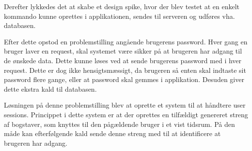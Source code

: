 Derefter lykkedes det at skabe et design spike, hvor der blev testet at en enkelt kommando kunne oprettes i applikationen, sendes til serveren og udføres vha. databasen. 

Efter dette opstod en problemstilling angående brugerens password. Hver gang en bruger laver en request, skal systemet være sikker på at brugeren har adgang til de ønskede data. Dette kunne løses ved at sende brugerens password med i hver request. Dette er dog ikke hensigtsmæssigt, da brugeren så enten skal indtaste sit password flere gange, eller at password skal gemmes i applikation. Desuden giver dette ekstra kald til databasen. 

Løsningen på denne problemstilling blev at oprette et system til at håndtere user sessions. Princippet i dette system er at der oprettes en tilfældigt genereret streng af bogstaver, som knyttes til den pågældende bruger i et vist tidsrum. På den måde kan efterfølgende kald sende denne streng med til at identificere at brugeren har adgang. 
